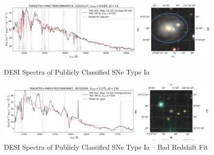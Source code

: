 \begin{frame}
    \begin{figure}[t]
        \centering
        \includegraphics[width=\textwidth]{figures/desi_figures/SNe_Detection.png}
        \caption{DESI Spectra of Publicly Classified SNe Type Ia}
        \label{fig:desi_supernova}
        \includegraphics[width=\textwidth]{figures/desi_figures/SNe_detection_desifail.png}
        \caption{DESI Spectra of Publicly Classified SNe Type Ia -- Bad Redshift Fit}
        \label{fig:desi_supernova_fail}
    \end{figure}
\end{frame}


